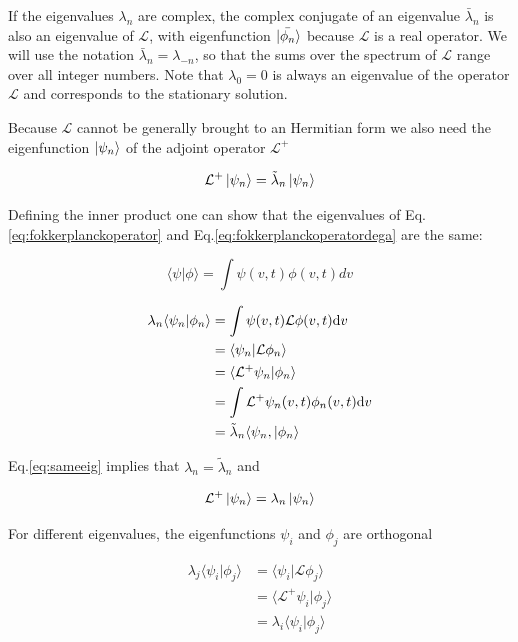 \documentclass[a4paper,11pt,twoside]{article}
\def \dd  {{\rm d}}
\numberwithin{equation}{section}
\begin{document}
If the eigenvalues $\lambda_n$ are complex, the complex conjugate of an eigenvalue  $\bar{\lambda}_n$  is also an eigenvalue of $\mathcal{L}$, with eigenfunction $\ket{\bar{\phi_n}}$ because $\mathcal{L}$ is a real operator. We will use the notation $\bar{\lambda}_n=\lambda_{-n}$, so that the sums over the spectrum of $\mathcal{L}$ range over all integer numbers. Note that $\lambda_0=0$ is always an eigenvalue of the operator $\mathcal{L}$ and corresponds to the stationary solution.

Because $\mathcal{L}$ cannot be generally brought to an Hermitian form we also need  the eigenfunction $\ket{\psi_n}$ of the adjoint operator  $\mathcal{L}^{+}$

\begin{equation}
\label{eq:fokkerplanckoperatordega}
\mathcal{L}^+\ket{\psi_n}=\tilde{\lambda}_n\ket{\psi_n}
\end{equation}

Defining the inner product one can show that the eigenvalues of Eq.\eqref{eq:fokkerplanckoperator} and Eq.\eqref{eq:fokkerplanckoperatordega} are the same:

\begin{equation}
\label{eq:innerproduct}
\langle\psi|\phi\rangle=\int\psi(v,t)\phi(v,t)dv
\end{equation}

\begin{align}
\lambda_n\langle\psi_n|\phi_n\rangle &=\int\psi(v,t)\mathcal{L}\phi(v,t)\dd v  \nonumber \\
&=\langle\psi_n|\mathcal{L}\phi_n\rangle \nonumber \\
&=\langle\mathcal{L}^+\psi_n|\phi_n\rangle  \nonumber \\
&=\int\mathcal{L}^+\psi_n(v,t)\phi_n(v,t)\dd v \nonumber \\
&=\tilde{\lambda}_n\langle\psi_n,|\phi_n\rangle \label{eq:sameeig}
\end{align}

Eq.\eqref{eq:sameeig} implies that $\lambda_n=\tilde{\lambda}_n$ and

\begin{equation}
\label{eq:fokkerplanckoperatordega2}
\mathcal{L}^+\ket{\psi_n}=\lambda_n\ket{\psi_n}
\end{equation}


For different eigenvalues, the eigenfunctions $\psi_i$ and $\phi_j$ are orthogonal

\begin{align}
\lambda_j\langle\psi_i|\phi_j\rangle
&=\langle\psi_i|\mathcal{L}\phi_j\rangle \nonumber \\
&=\langle\mathcal{L}^+\psi_i|\phi_j\rangle  \nonumber \\
&=\lambda_i\langle\psi_i|\phi_j\rangle \label{eq:lorthogonal}
\end{align}
\end{document}
